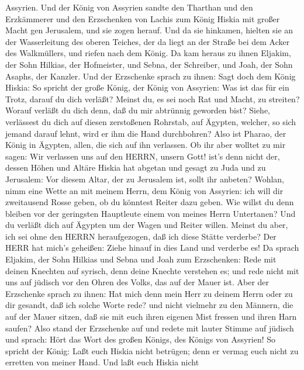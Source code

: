 Assyrien.  Und der König von Assyrien sandte den Tharthan
und den Erzkämmerer und den Erzschenken von Lachis zum König Hiskia mit
großer Macht gen Jerusalem, und sie zogen herauf. Und da sie hinkamen,
hielten sie an der Wasserleitung des oberen Teiches, der da liegt an der
Straße bei dem Acker des Walkmüllers,  und riefen nach dem
König. Da kam heraus zu ihnen Eljakim, der Sohn Hilkias, der Hofmeister,
und Sebna, der Schreiber, und Joah, der Sohn Asaphs, der Kanzler.
 Und der Erzschenke sprach zu ihnen: Sagt doch dem König
Hiskia: So spricht der große König, der König von Assyrien: Was ist das
für ein Trotz, darauf du dich verläßt?  Meinst du, es sei
noch Rat und Macht, zu streiten? Worauf verläßt du dich denn, daß du mir
abtrünnig geworden bist?  Siehe, verlässest du dich auf
diesen zerstoßenen Rohrstab, auf Ägypten, welcher, so sich jemand darauf
lehnt, wird er ihm die Hand durchbohren? Also ist Pharao, der König in
Ägypten, allen, die sich auf ihn verlassen.  Ob ihr aber
wolltet zu mir sagen: Wir verlassen uns auf den HERRN, unsern Gott!
ist's denn nicht der, dessen Höhen und Altäre Hiskia hat abgetan und
gesagt zu Juda und zu Jerusalem: Vor diesem Altar, der zu Jerusalem ist,
sollt ihr anbeten?  Wohlan, nimm eine Wette an mit meinem
Herrn, dem König von Assyrien: ich will dir zweitausend Rosse geben, ob
du könntest Reiter dazu geben.  Wie willst du denn bleiben
vor der geringsten Hauptleute einem von meines Herrn Untertanen? Und du
verläßt dich auf Ägypten um der Wagen und Reiter willen. 
Meinst du aber, ich sei ohne den HERRN heraufgezogen, daß ich diese
Stätte verderbe? Der HERR hat mich's geheißen: Ziehe hinauf in dies Land
und verderbe es!  Da sprach Eljakim, der Sohn Hilkias und
Sebna und Joah zum Erzschenken: Rede mit deinen Knechten auf syrisch,
denn deine Knechte verstehen es; und rede nicht mit uns auf jüdisch vor
den Ohren des Volks, das auf der Mauer ist.  Aber der
Erzschenke sprach zu ihnen: Hat mich denn mein Herr zu deinem Herrn oder
zu dir gesandt, daß ich solche Worte rede? und nicht vielmehr zu den
Männern, die auf der Mauer sitzen, daß sie mit euch ihren eigenen Mist
fressen und ihren Harn saufen?  Also stand der Erzschenke
auf und redete mit lauter Stimme auf jüdisch und sprach: Hört das Wort
des großen Königs, des Königs von Assyrien!  So spricht der
König: Laßt euch Hiskia nicht betrügen; denn er vermag euch nicht zu
erretten von meiner Hand.  Und laßt euch Hiskia nicht
